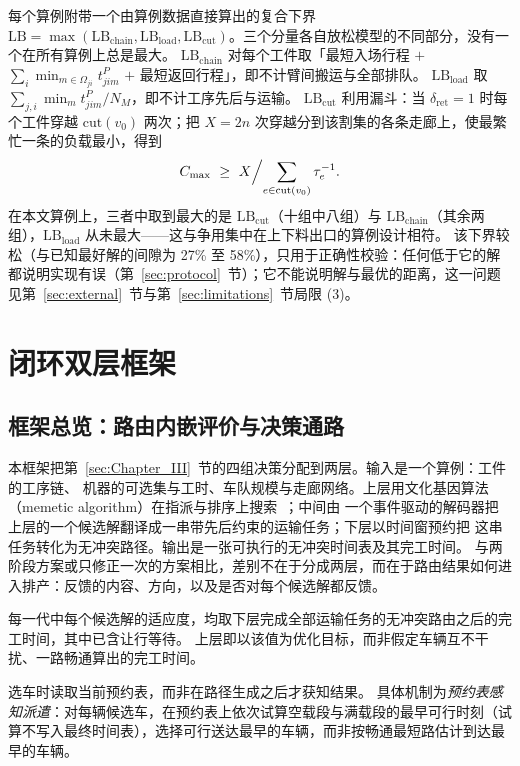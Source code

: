 \documentclass[manuscript,screen,review]{acmart}
\newcommand{\LBGapLo}{27\%}
\newcommand{\LBGapHi}{58\%}
\begin{document}
每个算例附带一个由算例数据直接算出的复合下界
$\mathrm{LB}=\max(\mathrm{LB}_{\text{chain}},\mathrm{LB}_{\text{load}},
\mathrm{LB}_{\text{cut}})$。三个分量各自放松模型的不同部分，没有一个在所有算例上总是最大。
$\mathrm{LB}_{\text{chain}}$ 对每个工件取「最短入场行程 $+$
$\sum_i \min_{m\in\Omega_{ji}}t^P_{jim}$ $+$ 最短返回行程」，即不计臂间搬运与全部排队。
$\mathrm{LB}_{\text{load}}$ 取 $\sum_{j,i}\min_m t^P_{jim}/N_M$，即不计工序先后与运输。
$\mathrm{LB}_{\text{cut}}$ 利用漏斗：当 $\delta_{\mathrm{ret}}=1$ 时每个工件穿越
$\mathrm{cut}(v_0)$ 两次；把 $X=2n$ 次穿越分到该割集的各条走廊上，使最繁忙一条的负载最小，得到
\begin{equation}
\label{eq:lbcut}
C_{\max}\ \ge\ X\Bigl/\sum_{e\in \mathrm{cut}(v_0)}\tau_e^{-1}.
\end{equation}
在本文算例上，三者中取到最大的是 $\mathrm{LB}_{\text{cut}}$（十组中八组）与
$\mathrm{LB}_{\text{chain}}$（其余两组），$\mathrm{LB}_{\text{load}}$ 从未最大——这与争用集中在上下料出口的算例设计相符。
该下界较松（与已知最好解的间隙为 \LBGapLo{} 至 \LBGapHi{}），只用于正确性校验：任何低于它的解都说明实现有误（第~\ref{sec:protocol}~节）；它不能说明解与最优的距离，这一问题见第~\ref{sec:external}~节与第~\ref{sec:limitations}~节局限 (3)。

\section{闭环双层框架}
\label{sec:Chapter_IV}
\subsection{框架总览：路由内嵌评价与决策通路}
\label{sec:overview}

本框架把第~\ref{sec:Chapter_III}~节的四组决策分配到两层。输入是一个算例：工件的工序链、
机器的可选集与工时、车队规模与走廊网络。上层用文化基因算法（memetic algorithm）在指派与排序上搜索~\cite{zhang2024memetic}；中间由
一个事件驱动的解码器把上层的一个候选解翻译成一串带先后约束的运输任务；下层以时间窗预约把
这串任务转化为无冲突路径。输出是一张可执行的无冲突时间表及其完工时间。
与两阶段方案或只修正一次的方案相比，差别不在于分成两层，而在于路由结果如何进入排产：反馈的内容、方向，以及是否对每个候选解都反馈。


\begin{description}[leftmargin=0pt,topsep=3pt,itemsep=3pt]
  \item[评价通路，即\emph{路由内嵌评价}。]
  每一代中每个候选解的适应度，均取下层完成全部运输任务的无冲突路由之后的完工时间，其中已含让行等待。
  上层即以该值为优化目标，而非假定车辆互不干扰、一路畅通算出的完工时间。
  \item[决策通路。]
  选车时读取当前预约表，而非在路径生成之后才获知结果。
  具体机制为\emph{预约表感知派遣}：对每辆候选车，在预约表上依次试算空载段与满载段的最早可行时刻（试算不写入最终时间表），选择可行送达最早的车辆，而非按畅通最短路估计到达最早的车辆。
\end{description}
\end{document}
